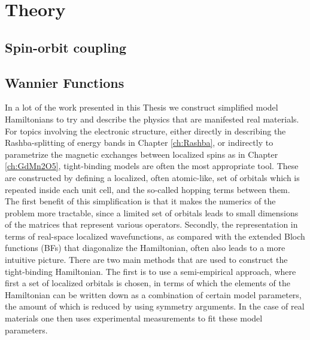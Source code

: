 \newcommand{\WanKet}[2]{\Ket{w_{#1\bm{#2}}(\bm{r})}}
\newcommand{\tildeWanKet}[2]{\Ket{\tilde{w}_{#1\bm{#2}}(\bm{r})}}
\newcommand{\ShortWanKet}[2]{\Ket{w_{#1\bm{#2}}}}
\newcommand{\tildeShortWanKet}[2]{\Ket{\tilde{w}_{#1\bm{#2}}}}
\newcommand{\ShortWanBra}[2]{\Bra{w_{#1\bm{#2}}}}
\newcommand{\tildeShortWanBra}[2]{\Bra{\tilde{w}_{#1\bm{#2}}}}

\newcommand{\Bloch}[1]{\psi_{#1\bm{k}}(\bm{r})}
\newcommand{\BlochKet}[1]{\Ket{\Bloch{#1}}}
\newcommand{\tildeBloch}[1]{\tilde{\psi}_{#1\bm{k}}(\bm{r})}
\newcommand{\tildeBlochKet}[1]{\Ket{\tildeBloch{#1}}}
\newcommand{\eikr}[1]{e^{i \bm{k}\cdot \bm{#1}}}
\newcommand{\inveikr}[1]{e^{-i \bm{k}\cdot \bm{#1}}}
\chapter{Theory}
\section{Spin-orbit coupling}
\section{Wannier Functions}

In a lot of the work presented in this Thesis we construct simplified model Hamiltonians to try and describe the physics that are manifested real materials.
For topics involving the electronic structure, either directly in describing the Rashba-splitting of energy bands in Chapter \ref{ch:Rashba}, or indirectly to parametrize the magnetic exchanges between localized spins as in Chapter \ref{ch:GdMn2O5}, tight-binding models are often the most appropriate tool.
These are constructed by defining a localized, often atomic-like, set of orbitals which is repeated inside each unit cell, and the so-called hopping terms between them.
The first benefit of this simplification is that it makes the numerics of the problem more tractable, since a limited set of orbitals leads to small dimensions of the matrices that represent various operators.
Secondly, the representation in terms of real-space localized wavefunctions, as compared with the extended Bloch functions (BFs) that diagonalize the Hamiltonian, often also leads to a more intuitive picture.
There are two main methods that are used to construct the tight-binding Hamiltonian.
The first is to use a semi-empirical approach, where first a set of localized orbitals is chosen, in terms of which the elements of the Hamiltonian can be written down as a combination of certain model parameters, the amount of which is reduced by using symmetry arguments.
In the case of real materials one then uses experimental measurements to fit these model parameters.

